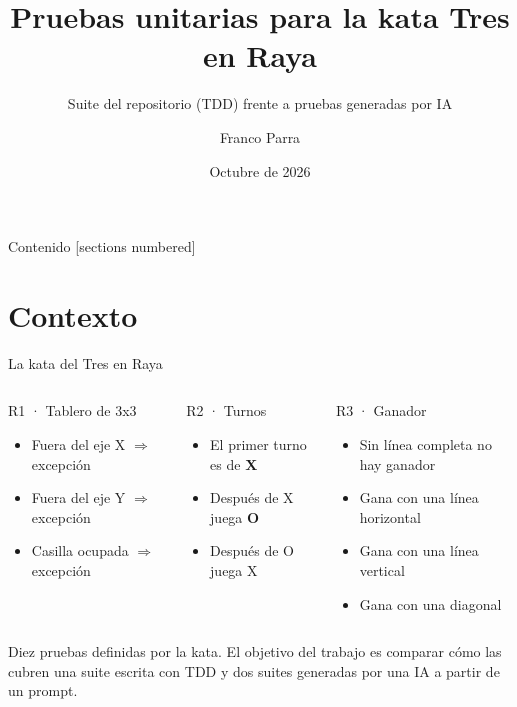 \documentclass[aspectratio=169,10pt]{beamer}
\title{Pruebas unitarias para la kata Tres en Raya}
\subtitle{Suite del repositorio (TDD) frente a pruebas generadas por IA}
\author{Franco Parra}
\institute{Gestión de Calidad de Sistemas · Universidad Católica Boliviana «San Pablo»}
\date{Octubre de 2026}
\begin{document}
\maketitle

\begin{frame}{Contenido}
  [sections numbered]
  \tableofcontents
\end{frame}

\section{Contexto}

\begin{frame}{La kata del Tres en Raya}
  \begin{columns}[T,onlytextwidth]
    \begin{block}{R1 · Tablero de 3x3}
      \footnotesize
      \begin{itemize}
        \item Fuera del eje X $\Rightarrow$ excepción
        \item Fuera del eje Y $\Rightarrow$ excepción
        \item Casilla ocupada $\Rightarrow$ excepción
      \end{itemize}
    \end{block}
    \begin{block}{R2 · Turnos}
      \footnotesize
      \begin{itemize}
        \item El primer turno es de \textcolor{colorX}{\textbf{X}}
        \item Después de X juega \textcolor{colorO}{\textbf{O}}
        \item Después de O juega X
      \end{itemize}
    \end{block}
    \begin{block}{R3 · Ganador}
      \footnotesize
      \begin{itemize}
        \item Sin línea completa no hay ganador
        \item Gana con una línea horizontal
        \item Gana con una línea vertical
        \item Gana con una diagonal
      \end{itemize}
    \end{block}
  \end{columns}
  \vfill
  \small Diez pruebas definidas por la kata. El objetivo del trabajo es comparar cómo las
  cubren una suite escrita con TDD y dos suites generadas por una IA a partir de un prompt.
\end{frame}
\end{document}
